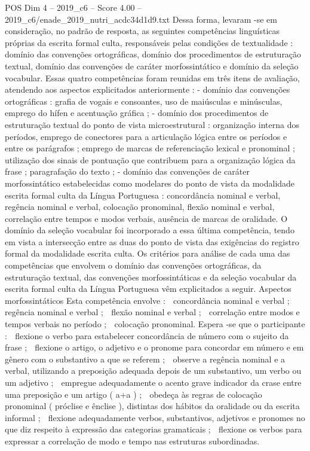 \begin{textsample}{POS Dim 4 – 2019\_c6 – Score 4.00 – 2019\_c6/enade\_2019\_nutri\_acdc34d1d9.txt}
Dessa forma, levaram -se em consideração, no padrão de resposta, as seguintes competências linguísticas próprias da escrita formal culta, responsáveis pelas condições de textualidade : domínio das convenções ortográficas, domínio dos procedimentos de estruturação textual, domínio das convenções de caráter morfossintático e domínio da seleção vocabular.
Essas quatro competências foram reunidas em três itens de avaliação, atendendo aos aspectos explicitados anteriormente : - domínio das convenções ortográficas : grafia de vogais e consoantes, uso de maiúsculas e minúsculas, emprego do hífen e acentuação gráfica ; - domínio dos procedimentos de estruturação textual do ponto de vista microestrutural : organização interna dos períodos, emprego de conectores para a articulação lógica entre os períodos e entre os parágrafos ; emprego de marcas de referenciação lexical e pronominal ; utilização dos sinais de pontuação que contribuem para a organização lógica da frase ; paragrafação do texto ; - domínio das convenções de caráter morfossintático estabelecidas como modelares do ponto de vista da modalidade escrita formal culta da Língua Portuguesa : concordância nominal e verbal, regência nominal e verbal, colocação pronominal, flexão nominal e verbal, correlação entre tempos e modos verbais, ausência de marcas de oralidade.
O domínio da seleção vocabular foi incorporado a essa última competência, tendo em vista a intersecção entre as duas do ponto de vista das exigências do registro formal da modalidade escrita culta.
Os critérios para análise de cada uma das competências que envolvem o domínio das convenções ortográficas, da estruturação textual, das convenções morfossintáticas e da seleção vocabular da escrita formal culta da Língua Portuguesa vêm explicitados a seguir.
Aspectos morfossintáticos Esta competência envolve :  concordância nominal e verbal ;  regência nominal e verbal ;  flexão nominal e verbal ;  correlação entre modos e tempos verbais no período ;  colocação pronominal.
Espera -se que o participante :  flexione o verbo para estabelecer concordância de número com o sujeito da frase ;  flexione o artigo, o adjetivo e o pronome para concordar em número e em gênero com o substantivo a que se referem ;  observe a regência nominal e a verbal, utilizando a preposição adequada depois de um substantivo, um verbo ou um adjetivo ;  empregue adequadamente o acento grave indicador da crase entre uma preposição e um artigo ( a+a ) ;  obedeça às regras de colocação pronominal ( próclise e ênclise ), distintas dos hábitos da oralidade ou da escrita informal ;  flexione adequadamente verbos, substantivos, adjetivos e pronomes no que diz respeito à expressão das categorias gramaticais ;  flexione os verbos para expressar a correlação de modo e tempo nas estruturas subordinadas.

\end{textsample}
